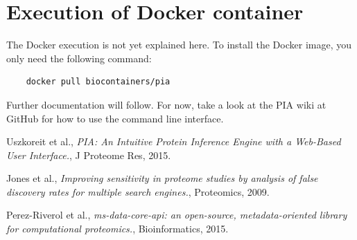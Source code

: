 \documentclass[a4paper,11pt,twoside]{article}
\begin{document}
\newpage
\section{Execution of Docker container}

The Docker execution is not yet explained here. To install the Docker image,
you only need the following command:

\begin{verbatim}
	docker pull biocontainers/pia
\end{verbatim}

Further documentation will follow. For now, take a look at the PIA wiki at
GitHub for how to use the command line interface.




\newpage
\begin{thebibliography}{9}
	Uszkoreit et al.,
	\emph{PIA: An Intuitive Protein Inference Engine with a Web-Based User
	Interface.},
	J Proteome Res,
	2015.

	Jones et al.,
	\emph{Improving sensitivity in proteome studies by analysis of false
	discovery rates for multiple search engines.},
	Proteomics,
	2009.

	Perez-Riverol et al.,
	\emph{ms-data-core-api: an open-source, metadata-oriented library for
	computational proteomics.},
	Bioinformatics,
	2015.
\end{thebibliography}
\end{document}

